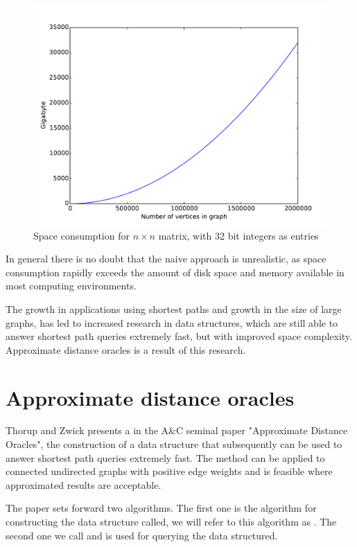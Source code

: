 \begin{figure}[htbp]
    \centering
    \includegraphics[width=\textwidth]{matrixsize.pdf}
    \caption{Space consumption for $n\times n$ matrix, with 32 bit integers as entries}
    \label{fig:matrixgrowth}
\end{figure}

In general there is no doubt that the naive approach is unrealistic, as space
consumption rapidly exceeds the amount of disk space and memory available in
most computing environments.

The growth in applications using shortest paths and growth in the size of
large graphs, has led to increased research in data structures, which are
still able to answer shortest path queries extremely fast, but with improved
space complexity. Approximate distance oracles is a result of this research.

\chapter{Approximate distance oracles}
\label{sec:ado}
Thorup and Zwick presents a in the A\&C seminal paper "Approximate Distance
Oracles"\cite{tu}, the construction of a data structure that subsequently
can be used to answer shortest path queries extremely fast. The method can
be applied to connected undirected graphs with positive edge weights and is
feasible where approximated results are acceptable.

The paper sets forward two algorithms. The first one is the algorithm for
constructing the data structure called, we will refer to this algorithm as
. The second one we call  and is used for querying
the data structured.

